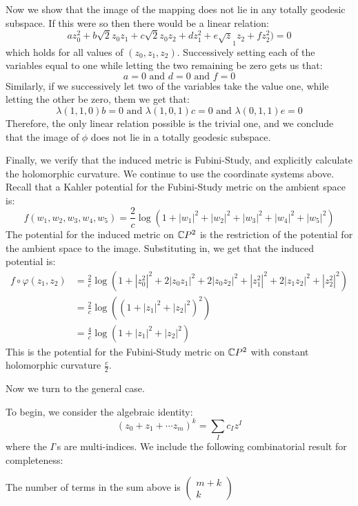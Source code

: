 \begin{example}
Now we show that the image of the mapping does not lie in any totally geodesic subspace.  If this were so then there would be a linear relation:
%
$$  a z_0^2 + b \sqrt{2} z_0 z_1 + c \sqrt{2} z_0 z_2 + d z_1^2 + e \sqrt z_1 z_2 + f z_2^2 ) = 0 $$
%
which holds for all values of $(z_0, z_1, z_2)$.  Successively setting each of the variables equal to one while letting the two remaining be zero gets us that:
%
$$ a = 0 \text{ and } d = 0 \text{ and } f = 0 $$
%
Similarly, if we successively let two of the variables take the value one, while letting the other be zero, them we get that:
%
$$ \lambda(1,1,0) b = 0 \text{ and } \lambda(1,0,1) c = 0 \text{ and } \lambda(0,1,1) e = 0 $$
%
Therefore, the only linear relation possible is the trivial one, and we conclude that the image of $\phi$ does not lie in a totally geodesic subspace.

Finally, we verify that the induced metric is Fubini-Study, and explicitly calculate the holomorphic curvature.  We continue to use the coordinate systems above.  Recall that a Kahler potential for the Fubini-Study metric on the ambient space is:
%
$$ f( w_1, w_2, w_3, w_4, w_5 ) = \frac{2}{c} \log ( 1 + |w_1|^2 + |w_2|^2 + |w_3|^2 + |w_4|^2 + |w_5|^2 ) $$
%
The potential for the induced metric on $\mathbb{C}P^2$ is the restriction of the potential for the ambient space to the image.  Substituting in, we get that the induced potential is:
%
\begin{align*}
f \circ \varphi ( z_1, z_2 ) &= \frac{2}{c} \log ( 1 + |z_0^2|^2 + 2|z_0 z_1|^2 + 2|z_0 z_2|^2 + |z_1^2|^2 + 2|z_1 z_2|^2 + |z_2^2|^2 ) \\
&= \frac{2}{c} \log( (1 + |z_1|^2 + |z_2|^2 )^2 ) \\
&= \frac{4}{c} \log( 1 + |z_1|^2 + |z_2|^2 )
\end{align*}
%
This is the potential for the Fubini-Study metric on $\mathbb{C}P^2$ with constant holomorphic curvature $\frac{c}{2}$.
%
\end{example}

Now we turn to the general case.

To begin, we consider the algebraic identity:
%
$$ (z_0 + z_1 + \cdots z_m )^k = \sum_I c_I z^I $$
%
where the $I$'s are multi-indices.  We include the following combinatorial result for completeness:
%
\begin{lem} The number of terms in the sum above is $\left( \begin{array}{c} m + k \\ k \end{array} \right)$
\end{lem}

